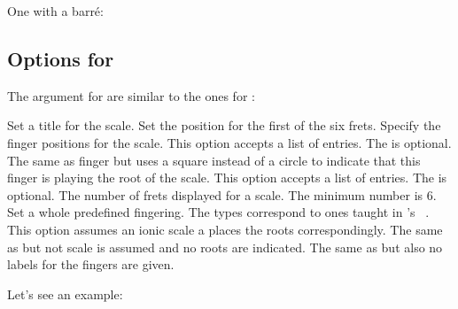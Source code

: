 \documentclass[toc=index,toc=bib]{cnpkgdoc}
\begin{document}
One with a barr\'e:

\begin{beispiel}
 \chordscheme[
   name      = Gmi\textsuperscript{7} ,
   position  = II ,
   barre     = 2/2-4:3 ,
   show-root = 4/4 ,
   root      = 2/6:2 ,
   mute      = {1,5}
 ]
\end{beispiel}

\subsection{Options for }
The  argument for  are similar to the ones for
:
\begin{beschreibung}
 \newline
   Set a title for the scale.
 \newline
   Set the position for the first of the six frets.
 \newline
   Specify the finger positions for the scale. This option accepts a list of entries.
   The  is optional.
 \newline
   The same as finger but uses a square instead of a circle to indicate that
   this finger is playing the root of the scale. This option accepts a list of
   entries. The  is optional.
   The number of frets displayed for a scale.  The minimum number is 6.
 \newline
   Set a whole predefined fingering. The types correspond to ones taught
   in \citeauthor{leavitt:mmfg:1}'s ~\cite{leavitt:mmfg:1}.
   This option assumes an ionic scale a places the roots correspondingly.
 \newline
   The same as  but not scale is assumed and no roots are
   indicated.
  \newline
   The same as  but also no labels for the fingers are given.
\end{beschreibung}

Let's see an example:
\begin{beispiel}[below]
 \scales[
   name      = F-major (Fingering Type~1A) ,
   position  = I ,
   fingering = type 1A
 ]
\end{beispiel}
\end{document}
